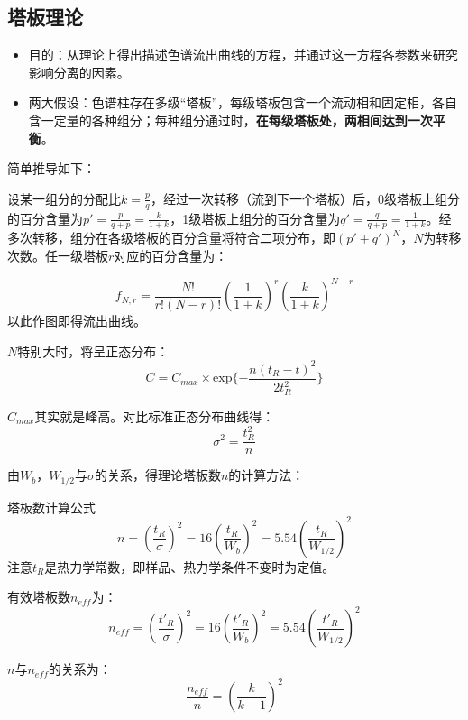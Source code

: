 \subsection{塔板理论}
\begin{itemize}
	\item 目的：从理论上得出描述色谱流出曲线的方程，并通过这一方程各参数来研究影响分离的因素。
	\item 两大假设：色谱柱存在多级“塔板”，每级塔板包含一个流动相和固定相，各自含一定量的各种组分；每种组分通过时，\textbf{在每级塔板处，两相间达到一次平衡}。
\end{itemize}

简单推导如下：

设某一组分的分配比$k=\frac{p}{q}$，经过一次转移（流到下一个塔板）后，0级塔板上组分的百分含量为$p'=\frac{p}{q+p}=\frac{k}{1+k}$，1级塔板上组分的百分含量为$q'=\frac{q}{q+p}=\frac{1}{1+k}$。经多次转移，组分在各级塔板的百分含量将符合二项分布，即${(p'+q')^N}$，$N$为转移次数。任一级塔板$r$对应的百分含量为：

\begin{equation*}
	f_{N,r}=\dfrac{N!}{r!(N-r)!} {(\dfrac{1}{1+k})}^r {(\dfrac{k}{1+k})}^{N-r}
\end{equation*}
以此作图即得流出曲线。

$N$特别大时，将呈正态分布：
\begin{equation*}
	C=C_{max}\times \mathrm{exp}\{-\dfrac{n(t_R-t)^2}{2t_R^2}\}
\end{equation*}

$C_{max}$其实就是峰高。对比标准正态分布曲线得：
\begin{equation*}
	{\sigma}^2=\dfrac{t_R^2}{n}
\end{equation*}

由$W_b$，$W_{1/2}$与$\sigma$的关系，得理论塔板数$n$的计算方法：

\begin{theorem*}{塔板数计算公式}{}
	\begin{equation}
	n={\left(\dfrac{t_R}{\sigma}\right)}^2=16{\left(\dfrac{t_R}{W_b}\right)}^2=5.54{\left(\dfrac{t_R}{W_{1/2}}\right)}^2\label{eqn:1.2}
	\end{equation}
	注意$t_R$是热力学常数，即样品、热力学条件不变时为定值。
	
	有效塔板数$n_{eff}$为：
	\begin{equation*}
	n_{eff}={\left(\dfrac{t'_R}{\sigma}\right)}^2=16{\left(\dfrac{t'_R}{W_b}\right)}^2=5.54{\left(\dfrac{t'_R}{W_{1/2}}\right)}^2
	\end{equation*}
	
	$n$与$n_{eff}$的关系为：
	\begin{equation}
		\dfrac{n_{eff}}{n}={\left(\dfrac{k}{k+1}\right)}^2
	\end{equation}
\end{theorem*}

